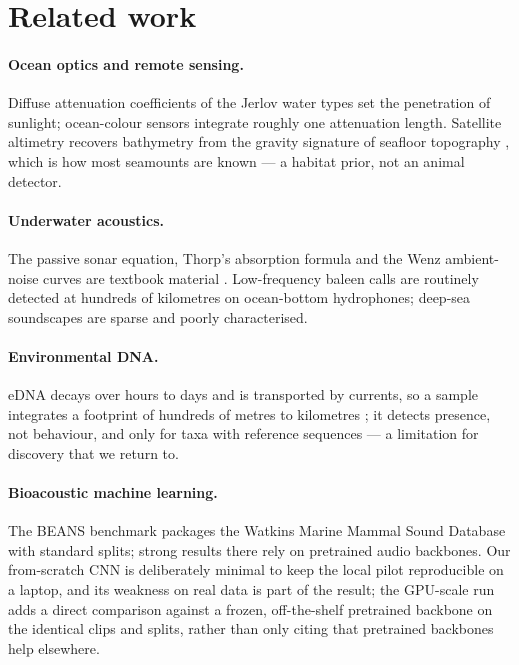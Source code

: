 \section{Related work}
\label{sec:related}

\paragraph{Ocean optics and remote sensing.} Diffuse attenuation coefficients
of the Jerlov water types \cite{jerlov1976marine, solonenko2015inherent} set
the penetration of sunlight; ocean-colour sensors integrate roughly one
attenuation length. Satellite altimetry recovers bathymetry from the gravity
signature of seafloor topography \cite{smith1997global}, which is how most
seamounts are known --- a habitat prior, not an animal detector.

\paragraph{Underwater acoustics.} The passive sonar equation, Thorp's
absorption formula and the Wenz ambient-noise curves are textbook material
\cite{urick1983principles, thorp1967analytic, wenz1962acoustic}. Low-frequency
baleen calls are routinely detected at hundreds of kilometres on ocean-bottom
hydrophones; deep-sea soundscapes are sparse and poorly characterised.

\paragraph{Environmental DNA.} eDNA decays over hours to days and is
transported by currents, so a sample integrates a footprint of hundreds of
metres to kilometres \cite{harrison2019predicting}; it detects presence, not
behaviour, and only for taxa with reference sequences --- a limitation for
discovery that we return to.

\paragraph{Bioacoustic machine learning.} The BEANS benchmark
\cite{hagiwara2022beans} packages the Watkins Marine Mammal Sound Database
with standard splits; strong results there rely on pretrained audio
backbones. Our from-scratch CNN is deliberately minimal to keep the local
pilot reproducible on a laptop, and its weakness on real data is part of
the result; the GPU-scale run adds a direct comparison against a frozen,
off-the-shelf pretrained backbone on the identical clips and splits,
rather than only citing that pretrained backbones help elsewhere.

